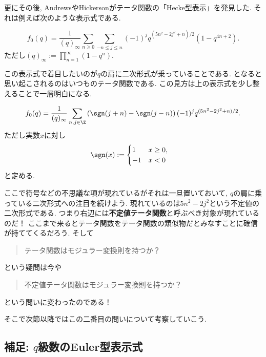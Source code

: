 \documentclass[11pt,b5paper,oneside,lualatex]{ltjsarticle} %
\numberwithin{equation}{section} %
\begin{document}
更にその後, AndrewsやHickersonがテータ関数の「Hecke型表示」を発見した. 
それは例えば次のような表示式である. 

\begin{thm}
	\[
	f_0 (q) = \frac{1}{(q)_\infty}
	\sum_{n \ge 0} \sum_{-n \le j \le n} (-1)^j q^{(5n^2 - 2j^2 + n)/2} (1 - q^{4n+2}).
	\]
	ただし$ (q)_\infty := \prod_{n=1}^{\infty} (1 - q^n) $.
\end{thm}

この表示式で着目したいのが$ q $の肩に二次形式が乗っていることである. 
となると思い起こされるのはいつものテータ関数である. 
この見方は上の表示式を少し整えることで一層明白になる. 

\begin{cor} \label{cor:mock_indefinite}
	\[
	f_0 (q) = \frac{1}{(q)_\infty}
	\sum_{n, j \in \Z} \left( \sgn(j+n) - \sgn(j-n) \right) (-1)^j q^{(5n^2 - 2j^2 + n)/2}.
	\]	
	ただし実数$ x $に対し
	\begin{align}
		\sgn(x) &:= 
		\begin{cases}
			1 & x \ge 0, \\
			-1 & x < 0
		\end{cases}
	\end{align}
	と定める. 
\end{cor}

ここで符号などの不思議な項が現れているがそれは一旦置いておいて, $ q $の肩に乗っている二次形式への注目を続けよう. 
現れているのは$ 5n^2 - 2j^2 $という不定値の二次形式である. 
つまり右辺には\textbf{不定値テータ関数}と呼ぶべき対象が現れているのだ！
ここまで来るとテータ関数をテータ関数の類似物だとみなすことに確信が持ててくるだろう. 
そして
\begin{quote}
	\centering
	テータ関数はモジュラー変換則を持つか？
\end{quote}
という疑問は今や
\begin{quote}
	\centering
	不定値テータ関数はモジュラー変換則を持つか？
\end{quote}
という問いに変わったのである！

そこで次節以降ではこの二番目の問いについて考察していこう. 


\subsection{補足: $ q $級数のEuler型表示式} \label{subsec:Eulerian_form}
\end{document}
